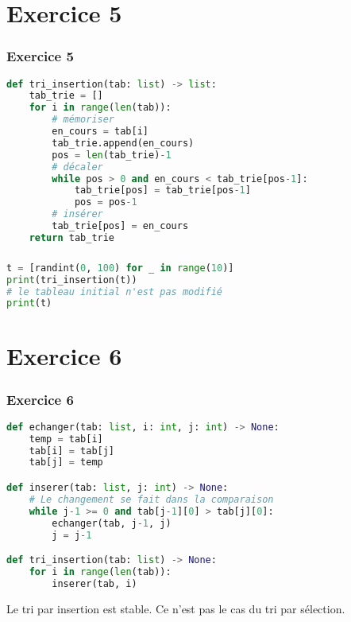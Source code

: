 \documentclass[svgnames,11pt]{beamer}
\begin{document}
\section{Exercice 5}
\begin{frame}[fragile]
    \frametitle{Exercice 5}
\begin{center}
\begin{lstlisting}[language=Python , basicstyle=\ttfamily\small, xleftmargin=0.2em, xrightmargin=-2em]
def tri_insertion(tab: list) -> list:
    tab_trie = []
    for i in range(len(tab)):
        # mémoriser
        en_cours = tab[i]
        tab_trie.append(en_cours)
        pos = len(tab_trie)-1
        # décaler
        while pos > 0 and en_cours < tab_trie[pos-1]:
            tab_trie[pos] = tab_trie[pos-1]
            pos = pos-1
        # insérer
        tab_trie[pos] = en_cours
    return tab_trie
\end{lstlisting}
\end{center}
    

\end{frame}
\begin{frame}[fragile]
    \frametitle{}

\begin{center}
\begin{lstlisting}[language=Python , basicstyle=\ttfamily\small, xleftmargin=2em, xrightmargin=2em]
t = [randint(0, 100) for _ in range(10)]
print(tri_insertion(t))
# le tableau initial n'est pas modifié
print(t)
\end{lstlisting}
\end{center}

\end{frame}
\section{Exercice 6}
\begin{frame}[fragile]
    \frametitle{Exercice 6}

\begin{center}
\begin{lstlisting}[language=Python , basicstyle=\ttfamily\small, xleftmargin=0.2em, xrightmargin=0em]
def echanger(tab: list, i: int, j: int) -> None:
    temp = tab[i]
    tab[i] = tab[j]
    tab[j] = temp

def inserer(tab: list, j: int) -> None:
    # Le changement se fait dans la comparaison
    while j-1 >= 0 and tab[j-1][0] > tab[j][0]:
        echanger(tab, j-1, j)
        j = j-1

def tri_insertion(tab: list) -> None:
    for i in range(len(tab)):
        inserer(tab, i)
\end{lstlisting}
\end{center}    
\begin{aretenir}[]
Le tri par insertion est stable. Ce n'est pas le cas du tri par sélection.
\end{aretenir}
\end{frame}
\end{document}
